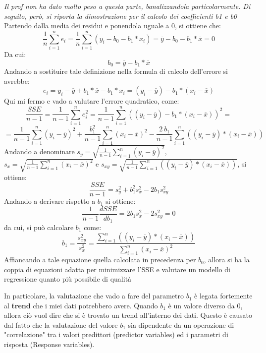 \begin{info}
\textit{Il prof non ha dato molto peso a questa parte, banalizzandola particolarmente. Di seguito, però, si riporta la dimostrazione per il calcolo dei coefficienti b1 e b0}
\\
Partendo dalla media dei residui e ponendola uguale a 0, si ottiene che:
\[
\frac{1}{n}\sum_{i=1}^{n}e_i = \frac{1}{n}\sum_{i=1}^{n}(y_i - b_0 - b_1 * x_i) = \overline{y} - b_0 - b_1 * \overline{x} = 0
\]
Da cui:
\[
b_0 = \overline{y} - b_1*\overline{x}
\]
Andando a sostituire tale definizione nella formula di calcolo dell'errore si avrebbe:
\[
e_i = y_i - \overline{y} + b_1*\overline{x} - b_1 * x_i = (y_i - \overline{y}) - b_1*(x_i - \overline{x})
\]
Qui mi fermo e vado a valutare l'errore quadratico, come:
\[
\frac{SSE}{n-1} = \frac{1}{n-1}\sum_{i=1}^{n}e_i^2 = \frac{1}{n-1}\sum_{i=1}^{n}\left ( (y_i - \overline{y}) - b_1*(x_i - \overline{x}) \right )^2=
\]
\[
= \frac{1}{n-1}\sum_{i=1}^{n}(y_i - \overline{y})^2 + \frac{b_1^2}{n-1}\sum_{i=1}^{n}(x_i - \overline{x})^2 - \frac{2\ b_1}{n-1}\sum_{i=1}^{n}((y_i - \overline{y})*(x_i - \overline{x}))
\]
Andando a denominare \(s_y = \sqrt{\frac{1}{n-1}\sum_{i=1}^{n}(y_i - \overline{y})^2}\), \(s_x = \sqrt{\frac{1}{n-1}\sum_{i=1}^{n}(x_i - \overline{x})^2}\) e \(s_{xy} = \sqrt{\frac{1}{n-1}\sum_{i=1}^{n}((y_i - \overline{y})*(x_i - \overline{x}))}\), si ottiene:
\[
\frac{SSE}{n-1} = s_y^2 + b_1^2 s_x^2 - 2 b_1 s_{xy}^2
\]
Andando a derivare rispetto a \(b_1\) si ottiene:
\[
\frac{1}{n-1}\frac{d SSE}{d b_1} = 2 b_1 s_x^2 - 2 s_{xy}^2 = 0
\]
da cui, si può calcolare \(b_1\) come:
\[
b_1 = \frac{s_{xy}^2}{s_{x}^2} = \frac{\sum_{i=1}^{n}((y_i - \overline{y})*(x_i - \overline{x}))}{\sum_{i=1}^{n}(x_i - \overline{x})^2}
\]
Affiancando a tale equazione quella calcolata in precedenza per \(b_0\), allora si ha la coppia di equazioni adatta per minimizzare l'SSE e valutare un modello di regressione quanto più possibile di qualità
\end{info}

In particolare, la valutazione che vado a fare del parametro \(b_1\) è legata fortemente al \textbf{trend} che i miei dati potrebbero avere. Quando \(b_1\) è un valore diverso da 0, allora ciò vuol dire che si è trovato un trend all'interno dei dati. Questo è causato dal fatto che la valutazione del valore \(b_1\) sia dipendente da un operazione di "correlazione" tra i valori predittori (predictor variables) ed i parametri di risposta (Response variables). 

